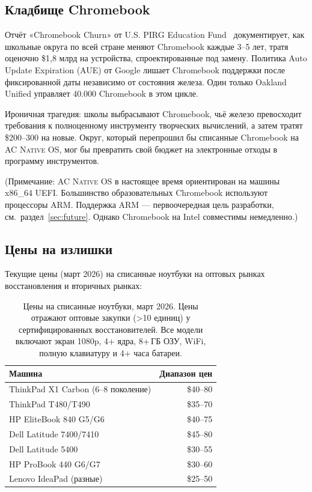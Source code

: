 \documentclass[10pt,letterpaper,twocolumn]{article}
\newcommand{\acos}{\textsc{AC Native OS}}
\begin{document}
\subsection{Кладбище Chromebook}

Отчёт «Chromebook Churn» от U.S. PIRG Education Fund~\citep{pirg2023chromebook} документирует, как школьные округа по всей стране меняют Chromebook каждые 3--5 лет, тратя оценочно \$1,8 млрд на устройства, спроектированные под замену. Политика Auto Update Expiration (AUE) от Google лишает Chromebook поддержки после фиксированной даты независимо от состояния железа. Один только Oakland Unified управляет 40.000 Chromebook в этом цикле.

Ироничная трагедия: школы выбрасывают Chromebook, чьё железо превосходит требования к полноценному инструменту творческих вычислений, а затем тратят \$200--300 на новые. Округ, который перепрошил бы списанные Chromebook на \acos{}, мог бы превратить свой бюджет на электронные отходы в программу инструментов.

(Примечание: \acos{} в настоящее время ориентирован на машины x86\_64 UEFI. Большинство образовательных Chromebook используют процессоры ARM. Поддержка ARM --- первоочередная цель разработки, см.\ раздел~\ref{sec:future}. Однако Chromebook на Intel совместимы немедленно.)

\subsection{Цены на излишки}

Текущие цены (март 2026) на списанные ноутбуки на оптовых рынках восстановления и вторичных рынках:

\begin{table}[h]
\small
\centering
\begin{tabular}{lr}
\toprule
\textbf{Машина} & \textbf{Диапазон цен} \\
\midrule
ThinkPad X1 Carbon (6--8 поколение) & \$40--80 \\
ThinkPad T480/T490 & \$35--70 \\
HP EliteBook 840 G5/G6 & \$40--75 \\
Dell Latitude 7400/7410 & \$45--80 \\
Dell Latitude 5400 & \$30--55 \\
HP ProBook 440 G6/G7 & \$30--60 \\
Lenovo IdeaPad (разные) & \$25--50 \\
\bottomrule
\end{tabular}
\caption{Цены на списанные ноутбуки, март 2026. Цены отражают оптовые закупки (\textgreater 10 единиц) у сертифицированных восстановителей. Все модели включают экран 1080p, 4+ ядра, 8+\,ГБ ОЗУ, WiFi, полную клавиатуру и 4+ часа батареи.}
\label{tab:surplus}
\end{table}
\end{document}
